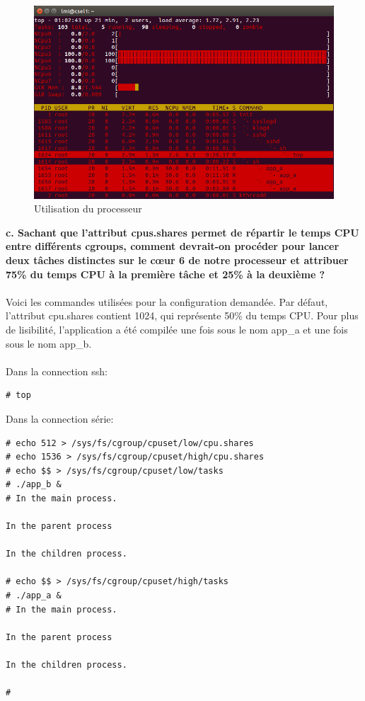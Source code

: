 \begin{figure}[H]
	\begin{center}
		\includegraphics[width=16cm]{img/multiprocessCGroup.png}
		\caption{Utilisation du processeur}
		\label{multiprocess1}
	\end{center}
\end{figure}
\textbf{c. Sachant	que	l’attribut	cpus.shares permet	de	répartir	le	temps	CPU	entre	différents	
	cgroups,	comment devrait-on	procéder	pour	lancer deux	tâches	distinctes	sur	le	cœur	6	de	
	notre	processeur	et	attribuer	75\%	du	temps	CPU	à	la	première	tâche	et	25\%	à	la	deuxième ?}\\\\
Voici les commandes utilisées pour la configuration demandée. Par défaut, l'attribut cpu.shares contient 1024, qui représente 50\% du temps CPU. Pour plus de lisibilité, l'application a été compilée une fois sous le nom app\_a et une fois sous le nom app\_b.\\\\
Dans la connection ssh:
\begin{lstlisting}
# top
\end{lstlisting}
Dans la connection série:
\begin{lstlisting}
# echo 512 > /sys/fs/cgroup/cpuset/low/cpu.shares 
# echo 1536 > /sys/fs/cgroup/cpuset/high/cpu.shares  
# echo $$ > /sys/fs/cgroup/cpuset/low/tasks                                     
# ./app_b &                                                                     
# In the main process.                                                          

In the parent process                                                           

In the children process.                                                        

# echo $$ > /sys/fs/cgroup/cpuset/high/tasks                                    
# ./app_a &                                                                     
# In the main process.                                                          

In the parent process                                                           

In the children process.                                                        

# 
\end{lstlisting}
